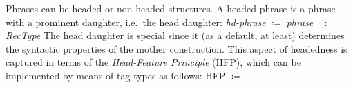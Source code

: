\documentclass[output=paper
 	        ,biblatex
                ,babelshorthands
                ,newtxmath
                ,draftmode
                ,colorlinks, citecolor=brown
]{langscibook}
\begin{document}
Phrases can be headed or non-headed structures.
%
%
A headed phrase is a phrase with a prominent daughter, i.e.\ the head daughter:
%
\ea 
\ea \emph{hd-phrase} $\coloneqq$ \emph{phrase} \ttrmerge\ 
 : \emph{RecType}
\ex 
{}
\z
\z
%
The head daughter is special since it (as a default, at least) determines the syntactic properties of the mother construction. 
%
This aspect of headedness is captured in terms of the \emph{Head-Feature Principle} (HFP), which can be implemented by means of tag types as follows:
%
\ea \label{ex:HFP}
HFP $\coloneqq$
\z
\end{document}
